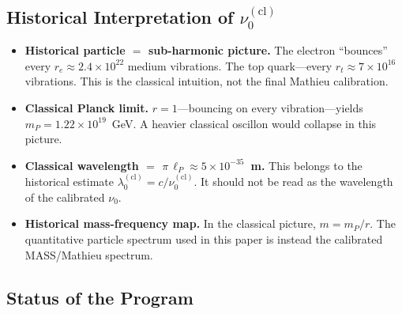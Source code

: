 \documentclass[11pt]{article}
\begin{document}
\subsection{Historical Interpretation of $\nu_0^{(\mathrm{cl})}$}

\begin{center}
\end{center}

\begin{itemize}
  \item \textbf{Historical particle $=$ sub-harmonic picture.}
    The electron ``bounces'' every
    $r_e \approx 2.4 \times 10^{22}$ medium vibrations. The top
    quark---every $r_t \approx 7 \times 10^{16}$ vibrations.
    This is the classical intuition, not the final Mathieu
    calibration.
  \item \textbf{Classical Planck limit.} $r = 1$---bouncing on every
    vibration---yields
    $m_P = 1.22 \times 10^{19}$~GeV.
    A heavier classical oscillon would collapse in this picture.
  \item \textbf{Classical wavelength $=$
    $\pi\,\ell_P \approx 5 \times 10^{-35}$~m.}
    This belongs to the historical estimate
    $\lambda_0^{(\mathrm{cl})}=c/\nu_0^{(\mathrm{cl})}$.
    It should not be read as the wavelength of the calibrated
    $\nu_0$.
  \item \textbf{Historical mass-frequency map.}
    In the classical picture, $m=m_P/r$.  The quantitative
    particle spectrum used in this paper is instead the calibrated
    MASS/Mathieu spectrum.
\end{itemize}

\subsection{Status of the Program}
\end{document}
